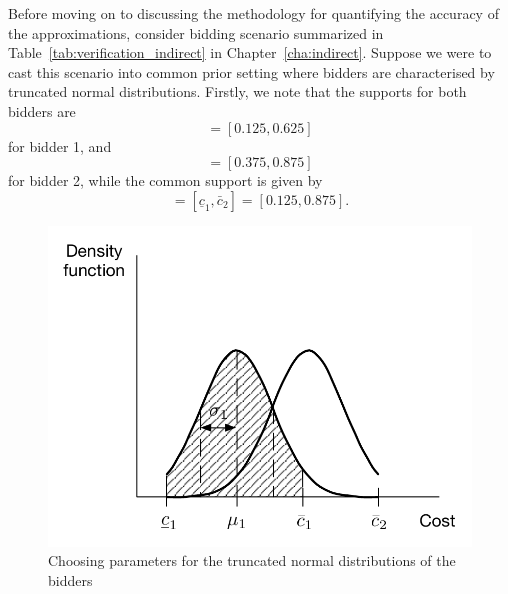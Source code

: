 Before moving on to discussing the methodology for quantifying the accuracy of the approximations, consider bidding scenario summarized in Table~\ref{tab:verification_indirect} in Chapter~\ref{cha:indirect}. Suppose we were to cast this scenario into common prior setting where bidders are characterised by truncated normal distributions. Firstly, we note that the supports for both bidders are
\begin{equation*}
  [\underline{c}_1, \bar{c}_1] = [0.125, 0.625]
\end{equation*}
for bidder 1, and
\begin{equation*}
  [\underline{c}_2, \bar{c}_2] = [0.375, 0.875]
\end{equation*}
for bidder 2, while the common support is given by
\begin{equation*}
  [\underline{c},\bar{c}] = [\underline{c}_1, \bar{c}_2] = [0.125, 0.875].
\end{equation*}

\begin{figure}[t]
  \includegraphics[width=\figsize]{Approximation/Figures/modelling_params}
  \caption{Choosing parameters for the truncated normal distributions of the bidders}
  \label{fig:modelling_params_approximation}
\end{figure}


